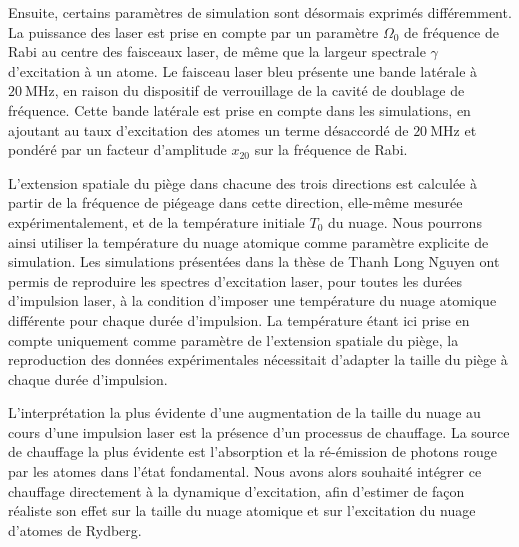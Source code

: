 Ensuite, certains paramètres de simulation sont désormais exprimés différemment.
La puissance des laser est prise en compte par un paramètre $\Omega_0$ de fréquence de Rabi au centre des faisceaux laser, de même que la largeur spectrale $\gamma$ d'excitation à un atome.
Le faisceau laser bleu présente une bande latérale à $\SI{20}{\MHz}$, en raison du dispositif de verrouillage de la cavité de doublage de fréquence.
Cette bande latérale est prise en compte dans les simulations, en ajoutant au taux d'excitation des atomes un terme désaccordé de $\SI{20}{\MHz}$ et pondéré par un facteur d'amplitude $x_{20}$ sur la fréquence de Rabi.

L'extension spatiale du piège dans chacune des trois directions est calculée à partir de la fréquence de piégeage dans cette direction, elle-même mesurée expérimentalement, et de la température initiale $T_0$ du nuage.
Nous pourrons ainsi utiliser la température du nuage atomique comme paramètre explicite de simulation.
%
Les simulations présentées dans la thèse de Thanh Long Nguyen \cite{PHD_NGUYEN} ont permis de reproduire les spectres d'excitation laser, pour toutes les durées d'impulsion laser, à la condition d'imposer une température du nuage atomique différente pour chaque durée d'impulsion.
La température étant ici prise en compte uniquement comme paramètre de l'extension spatiale du piège, la reproduction des données expérimentales nécessitait d'adapter la taille du piège à chaque durée d'impulsion.
%

L'interprétation la plus évidente d'une augmentation de la taille du nuage au cours d'une impulsion laser est la présence d'un processus de chauffage.
La source de chauffage la plus évidente est l'absorption et la ré-émission de photons rouge par les atomes dans l'état fondamental.
Nous avons alors souhaité intégrer ce chauffage directement à la dynamique d'excitation, afin d'estimer de façon réaliste son effet sur la taille du nuage atomique et sur l'excitation du nuage d'atomes de Rydberg.

